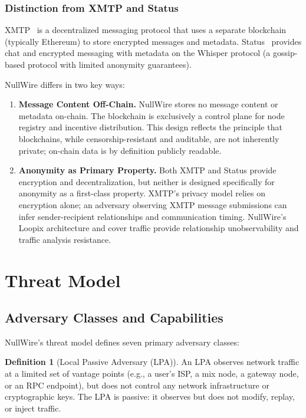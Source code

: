 \documentclass[11pt]{article}
\theoremstyle{definition}
\newtheorem{definition}{Definition}
\theoremstyle{remark}
\begin{document}
\subsubsection{Distinction from XMTP and Status}

XMTP~\cite{xmtp} is a decentralized messaging protocol that uses a separate blockchain (typically Ethereum) to store encrypted messages and metadata. Status~\cite{status} provides chat and encrypted messaging with metadata on the Whisper protocol (a gossip-based protocol with limited anonymity guarantees).

NullWire differs in two key ways:

\begin{enumerate}
    \item \textbf{Message Content Off-Chain.} NullWire stores no message content or metadata on-chain. The blockchain is exclusively a control plane for node registry and incentive distribution. This design reflects the principle that blockchains, while censorship-resistant and auditable, are not inherently private; on-chain data is by definition publicly readable.

    \item \textbf{Anonymity as Primary Property.} Both XMTP and Status provide encryption and decentralization, but neither is designed specifically for anonymity as a first-class property. XMTP's privacy model relies on encryption alone; an adversary observing XMTP message submissions can infer sender-recipient relationships and communication timing. NullWire's Loopix architecture and cover traffic provide relationship unobservability and traffic analysis resistance.
\end{enumerate}

\section{Threat Model}
\label{sec:threat}

\subsection{Adversary Classes and Capabilities}

NullWire's threat model defines seven primary adversary classes:

\begin{definition}[Local Passive Adversary (LPA)]
An LPA observes network traffic at a limited set of vantage points (e.g., a user's ISP, a mix node, a gateway node, or an RPC endpoint), but does not control any network infrastructure or cryptographic keys. The LPA is passive: it observes but does not modify, replay, or inject traffic.
\end{definition}
\end{document}
